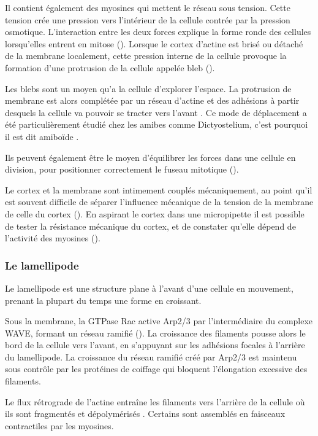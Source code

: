 Il contient également des myosines qui mettent le réseau sous tension. Cette tension crée une pression vers l'intérieur de la cellule contrée par la pression osmotique. L'interaction entre les deux forces explique la forme ronde des cellules lorsqu'elles entrent en mitose (\cite{stewart_hydrostatic_2011}).
Lorsque le cortex d'actine est brisé ou détaché de la membrane localement, cette pression interne de la cellule provoque la formation d'une protrusion de la cellule appelée bleb (\cite{paluch_cortical_2005}).

Les blebs sont un moyen qu'a la cellule d'explorer l'espace. La protrusion de membrane est alors complétée par un réseau d'actine et des adhésions à partir desquels la cellule va pouvoir se tracter vers l'avant \cite{charras_blebs_2008}. 
Ce mode de déplacement a été particulièrement étudié chez les amibes comme Dictyostelium, c'est pourquoi il est dit \og amiboïde \fg.  

Ils peuvent également être le moyen d'équilibrer les forces dans une cellule en division, pour positionner correctement le fuseau mitotique (\cite{sedzinski_polar_2011}).

Le cortex et la membrane sont intimement couplés mécaniquement, au point qu'il est souvent difficile de séparer l'influence mécanique de la tension de la membrane de celle du cortex (\cite{campillo_mechanics_2012}). 
En aspirant le cortex dans une micropipette il est possible de tester la résistance mécanique du cortex, et de constater qu'elle dépend de l'activité des myosines (\cite{bergert_cell_2012}).  



\subsubsection{Le lamellipode}

Le lamellipode est une structure plane à l'avant d'une cellule en mouvement, prenant la plupart du temps une forme en croissant. 

Sous la membrane, la GTPase Rac active Arp2/3 par l'intermédiaire du complexe WAVE, formant un réseau ramifié (\cite{lebensohn_activation_2009}). 
La croissance des filaments pousse alors le bord de la cellule vers l'avant, en s'appuyant sur les adhésions focales à l'arrière du lamellipode. 
La croissance du réseau ramifié créé par Arp2/3 est maintenu sous contrôle par les protéines de coiffage qui bloquent l'élongation excessive des filaments. 

Le flux rétrograde de l'actine entraîne les filaments vers l'arrière de la cellule où ils sont fragmentés et dépolymérisés . 
Certains sont assemblés en faisceaux contractiles par les myosines. 

